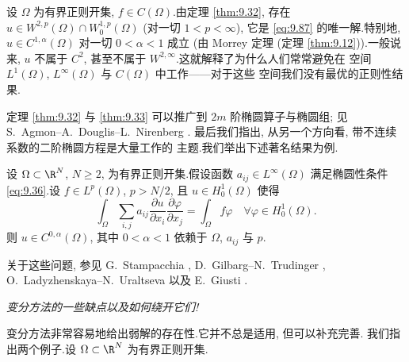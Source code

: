 设 $\Omega$ 为有界正则开集, $f\in C(\Omega)$.由定理  \ref{thm:9.32},
存在 $u\in W^{2,p}(\Omega)\cap W_0^{1,p}(\Omega)$ (对一切 $1<p<\infty$),
它是 \eqref{eq:9.87} 的唯一解.特别地, $u\in C^{1,\alpha}(\Omega)$ 对一切
$0<\alpha<1$ 成立 (由 Morrey 定理 (定理  \ref{thm:9.12})).一般说来, $u$
不属于 $C^2$, 甚至不属于 $W^{2,\infty}$.这就解释了为什么人们常常避免在
空间 $L^1(\Omega)$, $L^\infty(\Omega)$ 与 $C(\Omega)$ 中工作——对于这些
空间我们没有最优的正则性结果.

定理  \ref{thm:9.32} 与  \ref{thm:9.33} 可以推广到 $2m$ 阶椭圆算子与椭圆组;
见 S.~Agmon--A.~Douglis--L.~Nirenberg .
最后我们指出, 从另一个方向看, 带不连续系数的二阶椭圆方程是大量工作的
主题.我们举出下述著名结果为例.

\begin{keytheorem}
\label{thm:9.34}
设 $\Omega\subset\R^N$, $N\ge2$, 为有界正则开集.假设函数
$a_{ij}\in L^\infty(\Omega)$ 满足椭圆性条件 \eqref{eq:9.36}.设
$f\in L^p(\Omega)$, $p>N/2$, 且 $u\in H_0^1(\Omega)$ 使得
\begin{equation*}
\int_\Omega\sum_{i,j}a_{ij}\frac{\partial u}{\partial x_i}
\frac{\partial\varphi}{\partial x_j}=\int_\Omega f\varphi
\quad\forall\varphi\in H_0^1(\Omega).
\end{equation*}
则 $u\in C^{0,\alpha}(\Omega)$, 其中 $0<\alpha<1$ 依赖于 $\Omega$, $a_{ij}$
与 $p$.
\end{keytheorem}

关于这些问题, 参见 G.~Stampacchia ,
D.~Gilbarg--N.~Trudinger ,
O.~Ladyzhenskaya--N.~Uraltseva  以及
E.~Giusti .

 \emph{变分方法的一些缺点以及如何绕开它们!}

变分方法非常容易地给出弱解的存在性.它并不总是适用, 但可以补充完善.
我们指出两个例子.设 $\Omega\subset\R^N$ 为有界正则开集.

